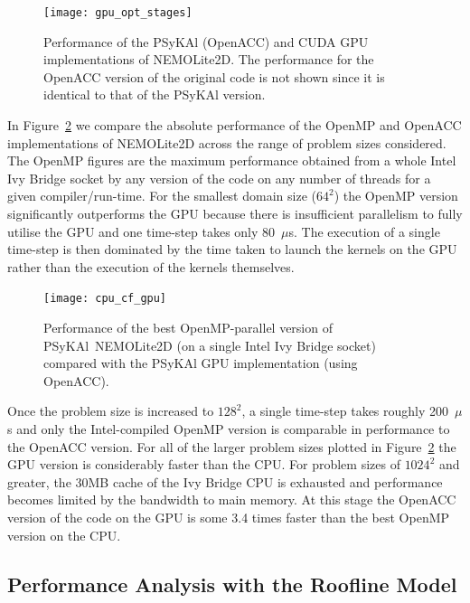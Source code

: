 \documentclass[gmd, manuscript]{copernicus}
\begin{document}
\begin{figure}
\centering
\texttt{[image: gpu\_opt\_stages]}
\caption{Performance of the {PS}y{KA}l (OpenACC) and CUDA GPU
  implementations of NEMOLite2D. The performance for the OpenACC
  version of the original code is not shown since it is identical to
  that of the {PS}y{KA}l version.}
\label{FIG_gpu_opt_stages}
\end{figure}

In Figure~\ref{FIG_cpu_cf_gpu} we compare the absolute performance of
the OpenMP and OpenACC implementations of NEMOLite2D across the range
of problem sizes considered. The OpenMP figures are the maximum
performance obtained from a whole Intel Ivy Bridge socket by any
version of the code on any number of threads for a given
compiler/run-time. For the smallest domain size ($64^2$) the OpenMP
version significantly outperforms the GPU because there is
insufficient parallelism to fully utilise the GPU and one time-step
takes only 80~$\mu$s. The execution of a single time-step is then
dominated by the time taken to launch the kernels on the GPU rather than
the execution of the kernels themselves.

\begin{figure}
\centering
\texttt{[image: cpu\_cf\_gpu]}
\caption{Performance of the best OpenMP-parallel version of {PS}y{KA}l\
  NEMOLite2D (on a single Intel Ivy Bridge socket) compared with the {PS}y{KA}l GPU implementation (using OpenACC).}
\label{FIG_cpu_cf_gpu}
\end{figure}

Once the problem size is increased to $128^2$, a single time-step
takes roughly 200~$\mu$s and only the Intel-compiled OpenMP version is
comparable in performance to the OpenACC version. For all of the
larger problem sizes plotted in Figure~\ref{FIG_cpu_cf_gpu} the GPU
version is considerably faster than the CPU.  For problem sizes of
$1024^2$ and greater, the 30MB cache of the Ivy Bridge CPU is
exhausted and performance becomes limited by the bandwidth to main
memory. At this stage the OpenACC version of the code on the GPU is
some 3.4 times faster than the best OpenMP version on the CPU.


\subsection{Performance Analysis with the Roofline Model}
\end{document}
